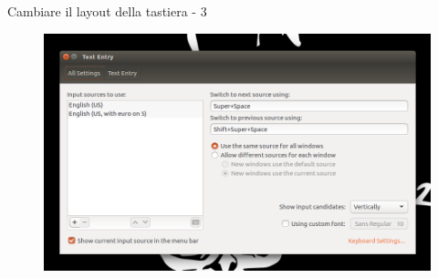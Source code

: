 \begin{frame}{Cambiare il layout della tastiera - 3}

\begin{figure}
\centering
\includegraphics[scale=0.31]{res/img/3}
\end{figure}

\end{frame}